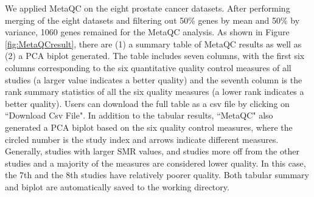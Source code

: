 We applied MetaQC on the eight prostate cancer datasets.
After performing merging of the eight datasets and filtering out 50\% genes by mean and 50\%  by variance, 1060 genes remained for the MetaQC analysis.
As shown in Figure \ref{fig:MetaQCresult}, there are {\color{red} (1)} a summary table of MetaQC results as well as {\color{red} (2)} a PCA biplot generated. The table includes seven columns, with the first six columns corresponding to the six quantitative quality control measures of all studies (a larger value indicates a better quality) and the seventh column is the rank summary statistics of all the six quality measures (a lower rank indicates a better quality). Users can download the full table as a csv file by clicking on ``Download Csv File". In addition to the tabular results, ``MetaQC" also generated a PCA biplot based on the six quality control measures, where the circled number is the study index and arrows indicate different measures. Generally, studies with larger SMR values, and studies more off from the other studies and a majority of the measures are considered lower quality. In this case, the 7th and the 8th studies have relatively poorer quality. Both tabular summary and biplot are automatically saved to the working directory. 


